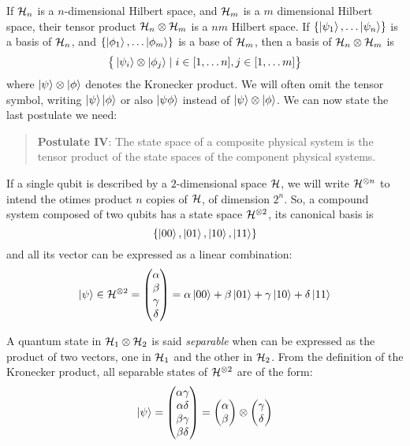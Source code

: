 If $\mathcal{H}_n$ is a $n$-dimensional Hilbert space, and $\mathcal{H}_m$ is a $m$ dimensional Hilbert space, their tensor product $\mathcal{H}_n \otimes \mathcal{H}_m$ is a $nm$ Hilbert space. If $\{\ket{\psi_1}, \ldots \ket{\psi_n}\}$ is a basis of $\mathcal{H}_n$, and $\{\ket{\phi_1}, \ldots\ket{\phi_m}\}$ is a base of $\mathcal{H}_m$, then a basis of $\mathcal{H}_n \otimes \mathcal{H}_m$ is\[\big\{\ket{\psi_i}\otimes\ket{\phi_j} \mid i \in [1, \ldots n], j \in [1, \ldots m] \big\}\]
 where $\ket{\psi} \otimes \ket{\phi}$ denotes the Kronecker product. We will often omit the tensor symbol, writing $\ket{\psi}\ket{\phi}$ or also $\ket{\psi\phi}$ instead of $\ket{\psi}\otimes\ket{\phi}$. We can now state the last postulate we need:

\begin{quote}
\textbf{Postulate IV}: The state space of a composite physical system is the tensor product of the state spaces of the component physical systems. 
\end{quote}

If a single qubit is described by a $2$-dimensional space $\mathcal{H}$, we will write $\mathcal{H}^{\otimes n}$ to intend the otimes product $n$ copies of $\mathcal{H}$, of dimension $2^n$. So, a compound system composed of two qubits has a state space $\mathcal{H}^{\otimes 2}$, its canonical basis is 
\[\{\ket{00}, \ket{01}, \ket{10}, \ket{11}\}\]
and all its vector can be expressed as a linear combination:
\[\ket{\psi} \in \mathcal{H}^{\otimes 2} = \begin{pmatrix}
\alpha \\ \beta \\ \gamma \\ \delta
\end{pmatrix} = \alpha\ket{00} + \beta\ket{01} + \gamma\ket{10} + \delta\ket{11}\]

A quantum state in $\mathcal{H}_1 \otimes \mathcal{H}_2$ is said \textit{separable} when can be expressed as the product of two vectors, one in $\mathcal{H}_1$ and the other in $\mathcal{H}_2$. From the definition of the Kronecker product, all separable states of $\mathcal{H}^{\otimes 2}$ are of the form:
\[
 \ket{\psi} = \begin{pmatrix}
 \alpha\gamma \\ \alpha\delta \\ \beta\gamma \\ \beta\delta
 \end{pmatrix} = 
 \begin{pmatrix}
 \alpha \\ \beta
 \end{pmatrix} \otimes 
 \begin{pmatrix}
 \gamma \\ \delta
 \end{pmatrix}
\]

